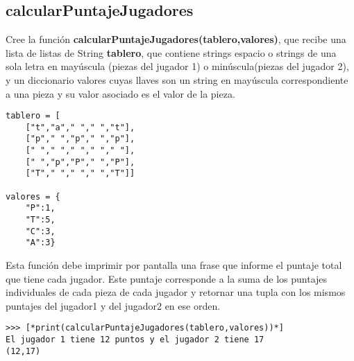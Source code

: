 \subsection*{calcularPuntajeJugadores}

Cree la función \textbf{calcularPuntajeJugadores(tablero,valores)}, que recibe una lista de listas de String  \textbf{tablero}, que contiene strings espacio o strings de una sola letra en mayúscula (piezas del jugador 1) o minúscula(piezas del jugador 2), y un diccionario valores cuyas llaves son un string en mayúscula correspondiente a una pieza y su valor asociado es el valor de la pieza.

\begin{lstlisting}[style=consola]
tablero = [
    ["t","a"," "," ","t"],
    ["p"," ","p"," ","p"],
    [" "," "," "," "," "],
    [" ","p","P"," ","P"],
    ["T"," "," "," ","T"]]

valores = {
    "P":1,
    "T":5,
    "C":3,
    "A":3}
\end{lstlisting}


Esta función debe imprimir por pantalla una frase que informe el puntaje total que tiene cada jugador. Este puntaje corresponde a la suma de los puntajes individuales de cada pieza de cada jugador y retornar una tupla con los mismos puntajes del jugador1 y del jugador2 en ese orden.

\begin{lstlisting}[style=consola]
>>> [*print(calcularPuntajeJugadores(tablero,valores))*]
El jugador 1 tiene 12 puntos y el jugador 2 tiene 17
(12,17)
\end{lstlisting}
